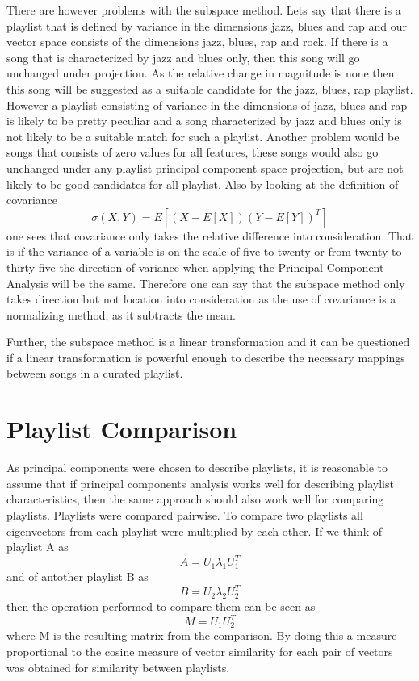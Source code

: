 \documentclass[a4paper,11pt]{kth-mag}
\begin{document}
There are however problems with the subspace method. Lets say that there is a playlist that is defined by variance in the dimensions jazz, blues and rap and our vector space consists of the dimensions jazz, blues, rap and rock. If there is a song that is characterized by jazz and blues only, then this song will go unchanged under projection. As the relative change in magnitude is none then this song will be suggested as a suitable candidate for the jazz, blues, rap playlist. However a playlist consisting of variance in the dimensions of jazz, blues and rap is likely to be pretty peculiar and a song characterized by jazz and blues only is not likely to be a suitable match for such a playlist. Another problem would be songs that consists of zero values for all features, these songs would also go unchanged under any playlist principal component space projection, but are not likely to be good candidates for all playlist. Also by looking at the definition of covariance 
\begin{equation}
\sigma(X, Y) = E[(X - E[X]) (Y - E[Y])^T]
\end{equation} 
one sees that covariance only takes the relative difference into consideration. That is if the variance of a variable is on the scale of five to twenty or from twenty to thirty five the direction of variance when applying the Principal Component Analysis will be the same. Therefore one can say that the subspace method only takes direction but not location into consideration as the use of covariance is a normalizing method, as it subtracts the mean.

Further, the subspace method is a linear transformation and it can be questioned if a linear transformation is powerful enough to describe the necessary mappings between songs in a curated playlist.

\section{Playlist Comparison}
As principal components were chosen to describe playlists, it is reasonable to assume that if principal components analysis works well for describing playlist characteristics, then the same approach should also work well for comparing playlists. Playlists were compared pairwise. To compare two playlists all eigenvectors from each playlist were multiplied by each other. If we think of playlist A as  \[A = U_1 \lambda_1 U_1^T\] and of antother playlist B as \[B = U_2 \lambda_2 U_2^T\] then the operation performed to compare them can be seen as \[M = U_1 U_2^T\] where M is the resulting matrix from the comparison. By doing this a measure proportional to the cosine measure of vector similarity for each pair of vectors was obtained for similarity between playlists. 
\end{document}
